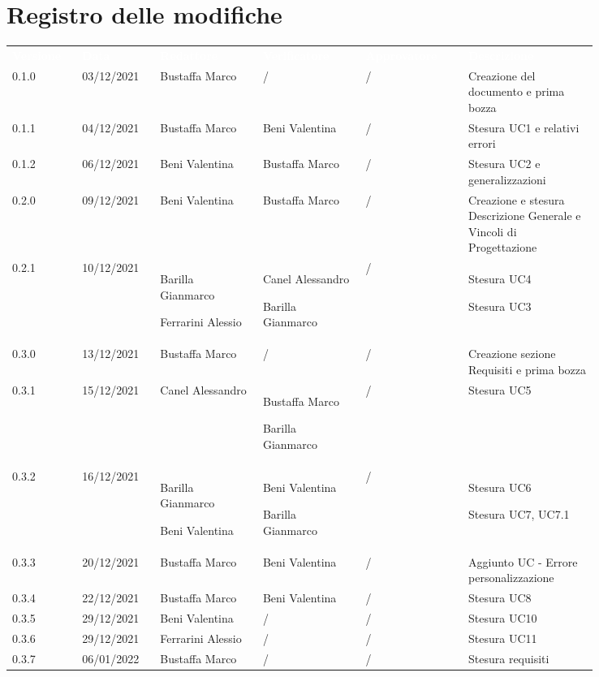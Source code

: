 \section*{Registro delle modifiche}

{\renewcommand{\arraystretch}{1.5}
\scriptsize
\begin{tabular}{p{0.10\linewidth}p{0.10\linewidth}p{0.15\linewidth}p{0.15\linewidth}p{0.15\linewidth}p{0.19\linewidth}}
	\rowcolor[RGB]{33, 73, 50}
	\textcolor{white}{\textbf{Versione}} & \textcolor{white}{\textbf{Data}} &
	\textcolor{white}{\textbf{Redattore}} & \textcolor{white}{\textbf{Verificatore}} &
	\textcolor{white}{\textbf{Approvatore}} & \textcolor{white}{\textbf{Descrizione}}\\
	\rowcolor[RGB]{216, 235, 171}
	0.1.0 & 03/12/2021 & Bustaffa Marco& / &/& Creazione del documento e prima bozza\\
	\rowcolor[RGB]{233, 245, 206}
	0.1.1 & 04/12/2021 & Bustaffa Marco& Beni Valentina &/& Stesura UC1 e relativi errori\\
	\rowcolor[RGB]{216, 235, 171}
	0.1.2 & 06/12/2021 & Beni Valentina& Bustaffa Marco &/& Stesura UC2 e generalizzazioni\\
	\rowcolor[RGB]{233, 245, 206}
	0.2.0 & 09/12/2021 & Beni Valentina& Bustaffa Marco &/& Creazione e stesura Descrizione Generale e Vincoli di Progettazione\\
	\rowcolor[RGB]{216, 235, 171}
	0.2.1 & 10/12/2021 & Barilla Gianmarco \par Ferrarini Alessio& Canel Alessandro \par Barilla Gianmarco &/& Stesura UC4 \par Stesura UC3 \\
	\rowcolor[RGB]{233, 245, 206}
	0.3.0 & 13/12/2021 & Bustaffa Marco& / &/& Creazione sezione Requisiti e prima bozza\\
	\rowcolor[RGB]{216, 235, 171}
	0.3.1 & 15/12/2021 & Canel Alessandro& Bustaffa Marco \par Barilla Gianmarco&/& Stesura UC5\\
	\rowcolor[RGB]{233, 245, 206}
	0.3.2 & 16/12/2021 & Barilla Gianmarco \par Beni Valentina& Beni Valentina \par Barilla Gianmarco &/& Stesura UC6 \par Stesura UC7, UC7.1\\
	\rowcolor[RGB]{216, 235, 171}
	0.3.3 & 20/12/2021 & Bustaffa Marco& Beni Valentina &/& Aggiunto UC - Errore personalizzazione\\
	\rowcolor[RGB]{233, 245, 206}
	0.3.4 & 22/12/2021 & Bustaffa Marco& Beni Valentina &/& Stesura UC8\\
	\rowcolor[RGB]{216, 235, 171}
	0.3.5 & 29/12/2021 & Beni Valentina& / &/& Stesura UC10\\
	\rowcolor[RGB]{233, 245, 206}
	0.3.6 & 29/12/2021 & Ferrarini Alessio& / &/& Stesura UC11\\
	\rowcolor[RGB]{216, 235, 171}
	0.3.7 & 06/01/2022 & Bustaffa Marco& / & /& Stesura requisiti\\
\end{tabular}
}
